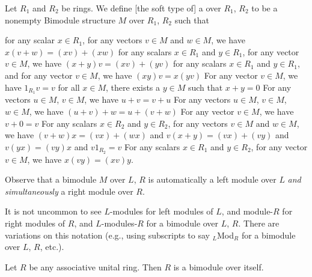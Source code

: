\begin{definition}
Let $R_{1}$ and $R_{2}$ be rings.
We define [the soft type of] a  over $R_{1}$, $R_{2}$
to be a nonempty Bimodule structure $M$ over $R_{1}$, $R_{2}$ such
that
\begin{itemize}
 for any scalar
$x\in R_{1}$, for any vectors $v\in M$ and $w\in M$, we have $x(v+w)=(xv)+(xw)$
 for any scalars
$x\in R_{1}$ and $y\in R_{1}$, for any vector $v\in M$, we have $(x+y)v=(xv)+(yv)$
 for any scalars
$x\in R_{1}$ and $y\in R_{1}$, and for any vector $v\in M$, we have $(xy)v=x(yv)$
 For any vector $v\in M$, we have $1_{R_{1}}v=v$
 for all $x\in M$, there exists a $y\in M$ such that $x+y=0$
 For any vectors
$u\in M$, $v\in M$, we have $u+v=v+u$
 For any vectors
$u\in M$, $v\in M$, $w\in M$, we have $(u+v)+w=u+(v+w)$
 For any vector $v\in M$,
we have $v+0=v$
 For any scalars $x\in R_{2}$
and $y\in R_{2}$, for any vectors $v\in M$ and $w\in M$, we have
$(v+w)x=(vx)+(wx)$ and $v(x+y)=(vx)+(vy)$ and $v(yx)=(vy)x$ and $v1_{R_{2}}=v$
 For any scalars $x\in R_{1}$
and $y\in R_{2}$, for any vector $v\in M$, we have $x(vy)=(xv)y$.
\end{itemize}
\end{definition}

\begin{remark}
Observe that a bimodule $M$ over $L$, $R$ is automatically a left
module over $L$ \emph{and simultaneously} a right module over $R$.
\end{remark}

\begin{remark}
It is not uncommon to see $L$-modules for left modules of $L$, and
module-$R$ for right modules of $R$, and $L$-modules-$R$ for a
bimodule over $L$, $R$. There are variations on this notation (e.g.,
using subscripts to say ${}_{L}$Mod${}_{R}$ for a bimodule over $L$,
$R$, etc.).
\end{remark}

\begin{example}
Let $R$ be any associative unital ring. 
Then $R$ is a bimodule over itself.
\end{example}